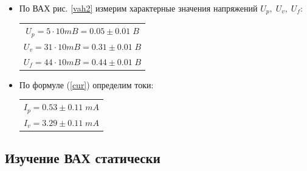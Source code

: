 \documentclass[a4paper]{article}
\begin{document}
\begin{itemize}
    \item По ВАХ рис. \ref{vah2} измерим характерные значения напряжений $U_p,\; U_v,\;U_f$:

    \begin{table}[H]
        \begin{center}
            \vspace{0.1cm}
            \begin{tabular}{|c|}
                \hline
                $U_p = 5\cdot 10mB = 0.05 \pm 0.01\;B$ \\ 
                $U_v = 31\cdot 10mB = 0.31 \pm 0.01\;B$ \\
                $U_f = 44 \cdot 10mB =  0.44 \pm 0.01 \;B$ \\
                \hline
            \end{tabular}
        \end{center}
    \end{table}

    \item По формуле (\ref{cur}) определим токи:
    
    \begin{table}[H]
        \begin{center}
            \vspace{0.1cm}
            \begin{tabular}{|c|}
                \hline
                $I_p = 0.53 \pm 0.11\; mA$ \\ 
                $I_v = 3.29 \pm 0.11 \; mA$ \\
                \hline
            \end{tabular}
        \end{center}
    \end{table}

\end{itemize}


\subsection{Изучение ВАХ статически}
\end{document}
